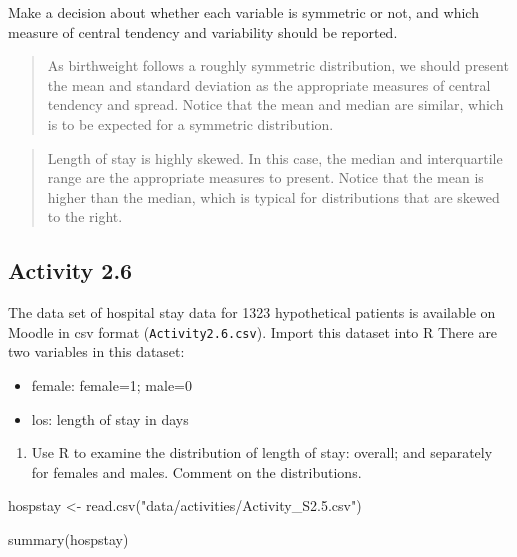 \documentclass[
]{memoir}
\newenvironment{Shaded}{\begin{snugshade}}{\end{snugshade}}
\newcommand{\FunctionTok}[1]{\textcolor[rgb]{0.00,0.00,0.00}{#1}}
\newcommand{\NormalTok}[1]{#1}
\newcommand{\OtherTok}[1]{\textcolor[rgb]{0.56,0.35,0.01}{#1}}
\newcommand{\StringTok}[1]{\textcolor[rgb]{0.31,0.60,0.02}{#1}}
\providecommand{\tightlist}{%
  \setlength{\itemsep}{0pt}\setlength{\parskip}{0pt}}
\begin{document}
Make a decision about whether each variable is symmetric or not, and which measure of central tendency and variability should be reported.

\begin{quote}
As birthweight follows a roughly symmetric distribution, we should present the mean and standard deviation as the appropriate measures of central tendency and spread. Notice that the mean and median are similar, which is to be expected for a symmetric distribution.
\end{quote}

\begin{quote}
Length of stay is highly skewed. In this case, the median and interquartile range are the appropriate measures to present. Notice that the mean is higher than the median, which is typical for distributions that are skewed to the right.
\end{quote}

\hypertarget{activity-2.6}{%
\subsection*{Activity 2.6}\label{activity-2.6}}

The data set of hospital stay data for 1323 hypothetical patients is available on Moodle in csv format (\texttt{Activity2.6.csv}). Import this dataset into R There are two variables in this dataset:

\begin{itemize}
\tightlist
\item
  female: female=1; male=0
\item
  los: length of stay in days
\end{itemize}

\begin{enumerate}
\def\labelenumi{\alph{enumi})}
\tightlist
\item
  Use R to examine the distribution of length of stay: overall; and separately for females and males. Comment on the distributions.
\end{enumerate}

\begin{Shaded}
\begin{Highlighting}[]
\NormalTok{hospstay }\OtherTok{\textless{}{-}} \FunctionTok{read.csv}\NormalTok{(}\StringTok{"data/activities/Activity\_S2.5.csv"}\NormalTok{)}

\FunctionTok{summary}\NormalTok{(hospstay)}
\end{Highlighting}
\end{Shaded}
\end{document}
